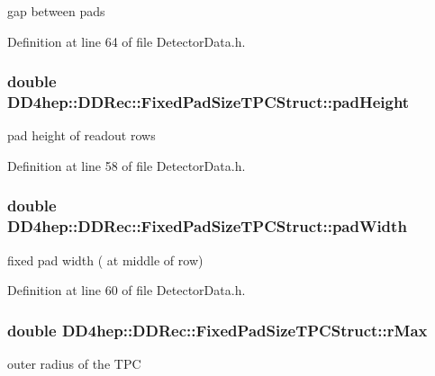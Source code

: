 gap between pads 

Definition at line 64 of file DetectorData.h.\hypertarget{struct_d_d4hep_1_1_d_d_rec_1_1_fixed_pad_size_t_p_c_struct_ab95a90cdaafbb23696608e1d1ad0df14}{
\subsubsection[{padHeight}]{\setlength{\rightskip}{0pt plus 5cm}double {\bf DD4hep::DDRec::FixedPadSizeTPCStruct::padHeight}}}
\label{struct_d_d4hep_1_1_d_d_rec_1_1_fixed_pad_size_t_p_c_struct_ab95a90cdaafbb23696608e1d1ad0df14}


pad height of readout rows 

Definition at line 58 of file DetectorData.h.\hypertarget{struct_d_d4hep_1_1_d_d_rec_1_1_fixed_pad_size_t_p_c_struct_aeac7b4785ec2067ddf6d50b8e19c8ee0}{
\subsubsection[{padWidth}]{\setlength{\rightskip}{0pt plus 5cm}double {\bf DD4hep::DDRec::FixedPadSizeTPCStruct::padWidth}}}
\label{struct_d_d4hep_1_1_d_d_rec_1_1_fixed_pad_size_t_p_c_struct_aeac7b4785ec2067ddf6d50b8e19c8ee0}


fixed pad width ( at middle of row) 

Definition at line 60 of file DetectorData.h.\hypertarget{struct_d_d4hep_1_1_d_d_rec_1_1_fixed_pad_size_t_p_c_struct_a623ee3ca76535b9c0ec2fe6c3e1ce415}{
\subsubsection[{rMax}]{\setlength{\rightskip}{0pt plus 5cm}double {\bf DD4hep::DDRec::FixedPadSizeTPCStruct::rMax}}}
\label{struct_d_d4hep_1_1_d_d_rec_1_1_fixed_pad_size_t_p_c_struct_a623ee3ca76535b9c0ec2fe6c3e1ce415}


outer radius of the TPC 

